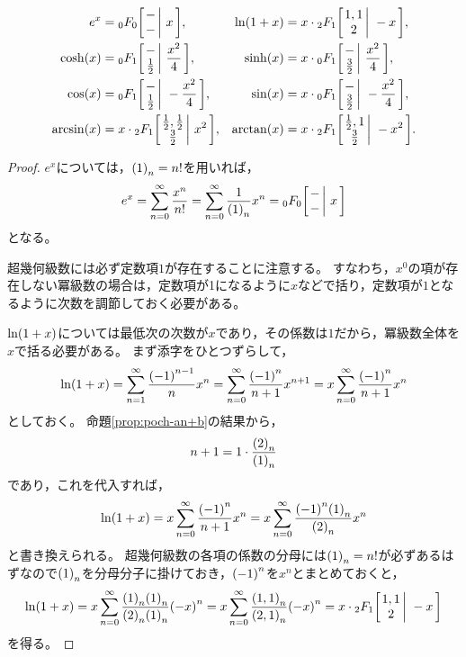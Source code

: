 \documentclass[a4paper,draft]{ltjsarticle}
\begin{document}
\begin{thm}
    \label{thm:gauss-指数関数・双曲線関数・三角関数・対数関数の超幾何級数表示}
    \begin{align}
        e^x&=\pfq{0}{0}{-}{-}{x},
        &
        \fun{\ln}{1+x}&=x\cdot \Gauss{1}{1}{2}{-x},
        \\
        \fun{\cosh}{x}&=\pfq{0}{1}{-}{\frac{1}{2}}{\frac{x^2}{4}},
        &
        \fun{\sinh}{x}&=x\cdot \pfq{0}{1}{-}{\frac{3}{2}}{\frac{x^2}{4}},
        \\
        \fun{\cos}{x}&=\pfq{0}{1}{-}{\frac{1}{2}}{-\frac{x^2}{4}},
        &
        \fun{\sin}{x}&=x\cdot \pfq{0}{1}{-}{\frac{3}{2}}{-\frac{x^2}{4}},
        \\
        \fun{\arcsin}{x}&=x\cdot \Gauss{\frac{1}{2}}{\frac{1}{2}}{\frac{3}{2}}{x^2},
        &
        \fun{\arctan}{x}&=x\cdot \Gauss{\frac{1}{2}}{1}{\frac{3}{2}}{-x^2}.
    \end{align}
    \begin{proof}        
        $e^x$については，$\poch{1}{n}=n!$を用いれば，
        \begin{equation}
            e^x=\sum_{n=0}^\infty \frac{x^n}{n!}=\sum_{n=0}^\infty \dfrac{1}{\poch{1}{n}}x^n=\pfq{0}{0}{-}{-}{x}
        \end{equation}
        となる。

        超幾何級数には必ず定数項$1$が存在することに注意する。
        すなわち，$x^0$の項が存在しない冪級数の場合は，定数項が1になるように$x$などで括り，定数項が$1$となるように次数を調節しておく必要がある。

        $\fun{\ln}{1+x}$については最低次の次数が$x$であり，その係数は$1$だから，冪級数全体を$x$で括る必要がある。
        まず添字をひとつずらして，
        \begin{equation}
            \fun{\ln}{1+x}=\sum_{n=1}^\infty \frac{\pare{-1}^{n-1}}{n}x^n
            =\sum_{n=0}^\infty \frac{\pare{-1}^n}{n+1}x^{n+1}=x\sum_{n=0}^\infty \frac{\pare{-1}^n}{n+1}x^{n}
        \end{equation}
        としておく。
        命題\ref{prop:poch-an+b}の結果から，
        \begin{equation}
            n+1=1\cdot \frac{\poch{2}{n}}{\poch{1}{n}}
        \end{equation}
        であり，これを代入すれば，
        \begin{equation}
            \fun{\ln}{1+x}=x\sum_{n=0}^\infty \frac{\pare{-1}^n}{n+1}x^{n}=x \sum_{n=0}^\infty \frac{\pare{-1}^n\poch{1}{n}}{\poch{2}{n}}x^n
        \end{equation}
        と書き換えられる。
        超幾何級数の各項の係数の分母には$\poch{1}{n}=n!$が必ずあるはずなので$\poch{1}{n}$を分母分子に掛けておき，$\pare{-1}^n$を$x^n$とまとめておくと，
        \begin{equation}
            \fun{\ln}{1+x}=x\sum_{n=0}^\infty \frac{\poch{1}{n}\poch{1}{n}}{\poch{2}{n}\poch{1}{n}}\pare{-x}^n=x\sum_{n=0}^\infty \dfrac{\poch{1,1}{n}}{\poch{2,1}{n}}\pare{-x}^n=x\cdot \Gauss{1}{1}{2}{-x}
        \end{equation}
        を得る。


\end{proof}
\end{thm}
\end{document}

